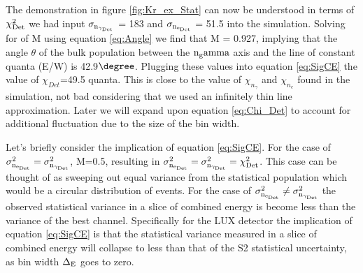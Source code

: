 \label{sec:Chi_ex_1}
The demonstration in figure \ref{fig:Kr_ex_Stat} can now be understood in terms of $\rm \chi_{Det}^2$ we had input $\rm \sigma_{n_{\gamma_{Det}}}$ = 183 and $\rm \sigma_{n_{e_{Det}}}$ = 51.5 into the simulation. Solving for of M using equation \ref{eq:Angle} we find that M = 0.927, implying that the angle $\theta$ of the bulk population between the $\rm n_gamma$ axis and the line of constant quanta (E/W) is 42.9$\degree$. Plugging these values into equation \ref{eq:SigCE} the value of $\chi_{Det}$=49.5 quanta. This is close to the value of $\chi_{n_\gamma}$ and $\chi_{n_e}$ found in the simulation, not bad considering that we used an infinitely thin line approximation. Later we will expand upon equation \ref{eq:Chi_Det} to account for additional fluctuation due to the size of the bin width.

 
 

Let's briefly consider the implication of equation \ref{eq:SigCE}. For the case of $\rm \sigma_{n_{e_{Det}}}^2 = \sigma_{n_{\gamma_{Det}}}^2$, M=0.5, resulting in $\rm \sigma_{n_{e_{Det}}}^2=\sigma_{n_{\gamma_{Det}}}^2= \chi_{Det}^2$. This case can be thought of as sweeping out equal variance from the statistical population which would be a circular distribution of events. For the case of $\rm \sigma_{n_{e_{Det}}}^2 \neq \sigma_{n_{\gamma_{Det}}}^2$ the observed statistical variance in a slice of combined energy is become less than the variance of the best channel. Specifically for the LUX detector the implication of equation \ref{eq:SigCE} is that the statistical variance measured in a slice of combined energy will collapse to less than that of the S2 statistical uncertainty, as bin width $\rm \Delta_E$ goes to zero.


